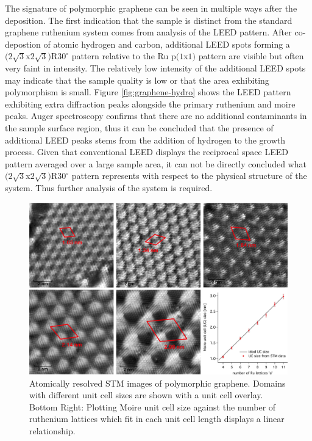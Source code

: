 The signature of polymorphic graphene can be seen in multiple ways after the deposition. The first indication that the sample is distinct from the standard graphene ruthenium system comes from analysis of the LEED pattern. After co-depostion of atomic hydrogen and carbon, additional LEED spots forming a $(2\sqrt{3}$x$2\sqrt{3})$R$30^\circ$ pattern relative to the Ru p$(1$x$1)$ pattern are visible but often very faint in intensity. The relatively low intensity of the additional LEED spots may indicate that the sample quality is low or that the area exhibiting polymorphism is small. Figure \ref{fig:graphene-hydro} shows the LEED pattern exhibiting extra diffraction peaks alongside the primary ruthenium and moire peaks. Auger spectroscopy confirms that there are no additional contaminants in the sample surface region, thus it can be concluded that the presence of additional LEED peaks stems from the addition of hydrogen to the growth process. Given that conventional LEED displays the reciprocal space LEED pattern averaged over a large sample area, it can not be directly concluded what $(2\sqrt{3}$x$2\sqrt{3})$R$30^\circ$ pattern represents with respect to the physical structure of the system. Thus further analysis of the system is required.

\begin{figure}
  \centering
  \includegraphics[scale=0.68]{./figs/unit-cell-plot.png}
  \caption{
  Atomically resolved STM images of polymorphic graphene. Domains with different unit cell sizes are shown with a unit cell overlay. Bottom Right: Plotting Moire unit cell size against the number of ruthenium lattices which fit in each unit cell length displays a linear relationship. 
  }
  \label{fig:unit-cell-plot}
\end{figure}

